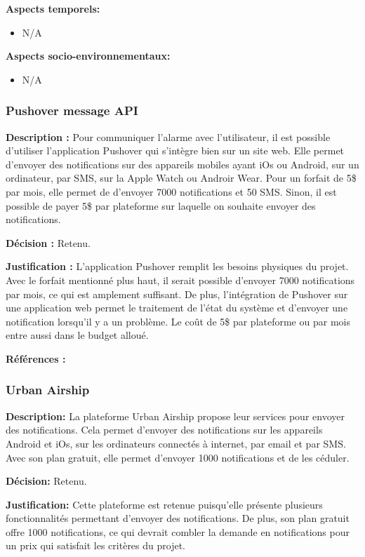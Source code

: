 \textbf{Aspects temporels:}
\begin{itemize}[label = {--}]
    \item N/A
\end{itemize}

\textbf{Aspects socio-environnementaux:}
\begin{itemize}[label = {--}]
    \item N/A
\end{itemize}

\subsubsection{Pushover message API}

\textbf{Description :} Pour communiquer l'alarme avec l'utilisateur, il est possible d'utiliser l'application Pushover qui s'intègre bien sur un site web. Elle permet d'envoyer des notifications sur des appareils mobiles ayant iOs ou Android, sur un ordinateur, par SMS, sur la Apple Watch ou Androir Wear. Pour un forfait de 5\$ par mois, elle permet de d'envoyer 7000 notifications et 50 SMS. Sinon, il est possible de payer 5\$ par plateforme sur laquelle on souhaite envoyer des notifications.

\textbf{Décision :} Retenu.

\textbf{Justification :} L'application Pushover remplit les besoins physiques du projet. Avec le forfait mentionné plus haut, il serait possible d'envoyer 7000 notifications par mois, ce qui est amplement suffisant. De plus, l'intégration de Pushover sur une application web permet le traitement de l'état du système et d'envoyer une notification lorsqu'il y a un problème. Le coût de 5\$ par plateforme ou par mois entre aussi dans le budget alloué.

\textbf{Références :} \cite{Pushover}


\subsubsection{Urban Airship}

\textbf{Description:} La plateforme Urban Airship propose leur services pour envoyer des notifications. Cela permet d'envoyer des notifications sur les appareils Android et iOs, sur les ordinateurs connectés à internet, par email et par SMS. Avec son plan gratuit, elle permet d'envoyer 1000 notifications et de les céduler.

\textbf{Décision:} Retenu.

\textbf{Justification:} Cette plateforme est retenue puisqu'elle présente plusieurs fonctionnalités permettant d'envoyer des notifications. De plus, son plan gratuit offre 1000 notifications, ce qui devrait combler la demande en notifications pour un prix qui satisfait les critères du projet.

